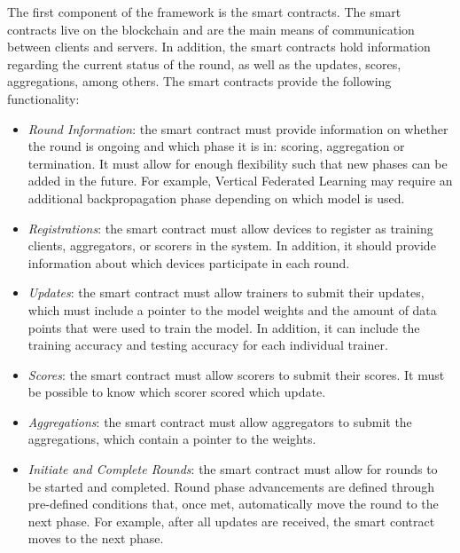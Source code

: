 The first component of the framework is the smart contracts. The smart contracts live on the blockchain and are the main means of communication between clients and servers. In addition, the smart contracts hold information regarding the current status of the round, as well as the updates, scores, aggregations, among others. The smart contracts provide the following functionality:

\begin{itemize}
    \item \textit{Round Information}: the smart contract must provide information on whether the round is ongoing and which phase it is in: scoring, aggregation or termination. It must allow for enough flexibility such that new phases can be added in the future. For example, Vertical Federated Learning may require an additional backpropagation phase depending on which model is used.
    
    \item \textit{Registrations}: the smart contract must allow devices to register as training clients, aggregators, or scorers in the system. In addition, it should provide information about which devices participate in each round.
    
    \item \textit{Updates}: the smart contract must allow trainers to submit their updates, which must include a pointer to the model weights and the amount of data points that were used to train the model. In addition, it can include the training accuracy and testing accuracy for each individual trainer.
    
    \item \textit{Scores}: the smart contract must allow scorers to submit their scores. It must be possible to know which scorer scored which update.
    
    \item \textit{Aggregations}: the smart contract must allow aggregators to submit the aggregations, which contain a pointer to the weights.
    
    \item \textit{Initiate and Complete Rounds}: the smart contract must allow for rounds to be started and completed. Round phase advancements are defined through pre-defined conditions that, once met, automatically move the round to the next phase. For example, after all updates are received, the smart contract moves to the next phase.
\end{itemize}

